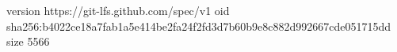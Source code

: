 version https://git-lfs.github.com/spec/v1
oid sha256:b4022ce18a7fab1a5e414be2fa24f2fd3d7b60b9e8c882d992667cde051715dd
size 5566
